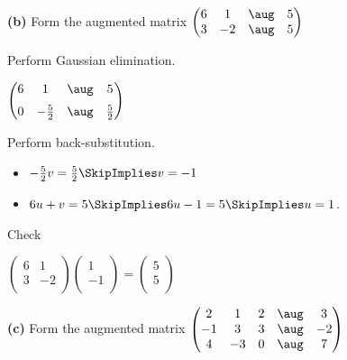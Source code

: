 \documentclass[oneside,12pt]{amsart}
\begin{document}
\bigskip


\textbf{(b)} Form the augmented matrix
$
\begin{pmatrix}
 6 &   1 &  \aug & 5  \\
 3 &  -2 &  \aug & 5  \\
\end{pmatrix}
$

Perform Gaussian elimination.


\bigskip

$
\begin{pmatrix}
 6 &   1           &  \aug & 5             \\[6pt]
 0 &  -\frac{5}{2} &  \aug & \frac{5}{2}  \\
\end{pmatrix}
$

\bigskip

Perform back-substitution.

\begin{itemize}
\item $-\frac{5}{2}v = \frac{5}{2}  \SkipImplies v = -1$
\item $6u+v=5 \SkipImplies 6u-1=5 \SkipImplies u = 1$.
\end{itemize}

\bigskip

Check

\bigskip

$
\begin{pmatrix}
 6 & 1 \\
 3 & -2 \\
\end{pmatrix}
\begin{pmatrix}
 1 \\
 -1 \\
\end{pmatrix}
=
\begin{pmatrix}
 5 \\
 5 \\
\end{pmatrix}
$

\bigskip


\textbf{(c)} Form the augmented matrix
$
\begin{pmatrix}
  2 &  1 &  2 & \aug &  3  \\
 -1 &  3 &  3 & \aug & -2  \\
  4 & -3 &  0 & \aug &  7  \\
\end{pmatrix}
$
\end{document}
